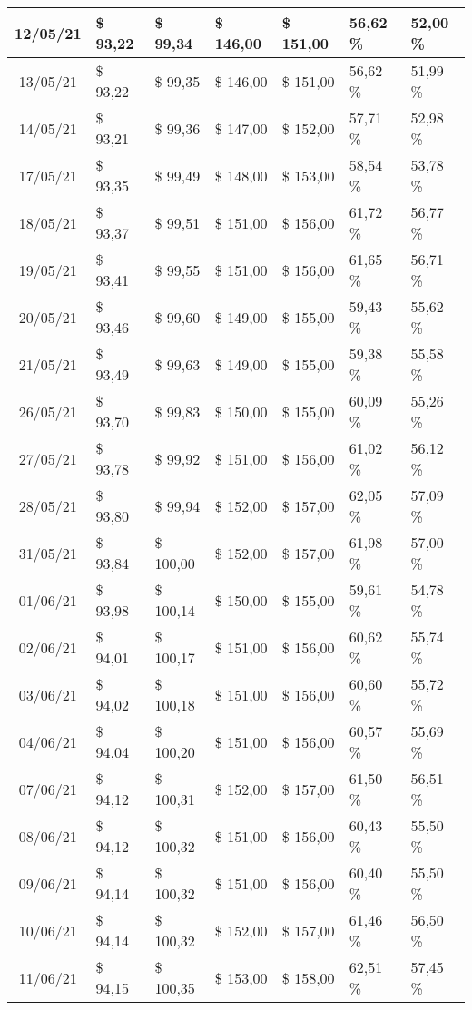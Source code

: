 \begin{center}
\begin{longtable}{|c|p{1.5cm}|p{1.5cm}|p{1.5cm}|p{1.5cm}|p{1.5cm}|p{1.5cm}|}
12/05/21 & \$ 93,22 & \$ 99,34 & \$ 146,00 & \$ 151,00 & 56,62 \% & 52,00 \% \\ \hline
13/05/21 & \$ 93,22 & \$ 99,35 & \$ 146,00 & \$ 151,00 & 56,62 \% & 51,99 \% \\ \hline
14/05/21 & \$ 93,21 & \$ 99,36 & \$ 147,00 & \$ 152,00 & 57,71 \% & 52,98 \% \\ \hline
17/05/21 & \$ 93,35 & \$ 99,49 & \$ 148,00 & \$ 153,00 & 58,54 \% & 53,78 \% \\ \hline
18/05/21 & \$ 93,37 & \$ 99,51 & \$ 151,00 & \$ 156,00 & 61,72 \% & 56,77 \% \\ \hline
19/05/21 & \$ 93,41 & \$ 99,55 & \$ 151,00 & \$ 156,00 & 61,65 \% & 56,71 \% \\ \hline
20/05/21 & \$ 93,46 & \$ 99,60 & \$ 149,00 & \$ 155,00 & 59,43 \% & 55,62 \% \\ \hline
21/05/21 & \$ 93,49 & \$ 99,63 & \$ 149,00 & \$ 155,00 & 59,38 \% & 55,58 \% \\ \hline
26/05/21 & \$ 93,70 & \$ 99,83 & \$ 150,00 & \$ 155,00 & 60,09 \% & 55,26 \% \\ \hline
27/05/21 & \$ 93,78 & \$ 99,92 & \$ 151,00 & \$ 156,00 & 61,02 \% & 56,12 \% \\ \hline
28/05/21 & \$ 93,80 & \$ 99,94 & \$ 152,00 & \$ 157,00 & 62,05 \% & 57,09 \% \\ \hline
31/05/21 & \$ 93,84 & \$ 100,00 & \$ 152,00 & \$ 157,00 & 61,98 \% & 57,00 \% \\ \hline
01/06/21 & \$ 93,98 & \$ 100,14 & \$ 150,00 & \$ 155,00 & 59,61 \% & 54,78 \% \\ \hline
02/06/21 & \$ 94,01 & \$ 100,17 & \$ 151,00 & \$ 156,00 & 60,62 \% & 55,74 \% \\ \hline
03/06/21 & \$ 94,02 & \$ 100,18 & \$ 151,00 & \$ 156,00 & 60,60 \% & 55,72 \% \\ \hline
04/06/21 & \$ 94,04 & \$ 100,20 & \$ 151,00 & \$ 156,00 & 60,57 \% & 55,69 \% \\ \hline
07/06/21 & \$ 94,12 & \$ 100,31 & \$ 152,00 & \$ 157,00 & 61,50 \% & 56,51 \% \\ \hline
08/06/21 & \$ 94,12 & \$ 100,32 & \$ 151,00 & \$ 156,00 & 60,43 \% & 55,50 \% \\ \hline
09/06/21 & \$ 94,14 & \$ 100,32 & \$ 151,00 & \$ 156,00 & 60,40 \% & 55,50 \% \\ \hline
10/06/21 & \$ 94,14 & \$ 100,32 & \$ 152,00 & \$ 157,00 & 61,46 \% & 56,50 \% \\ \hline
11/06/21 & \$ 94,15 & \$ 100,35 & \$ 153,00 & \$ 158,00 & 62,51 \% & 57,45 \% \\ \hline

\end{longtable}
\end{center}

